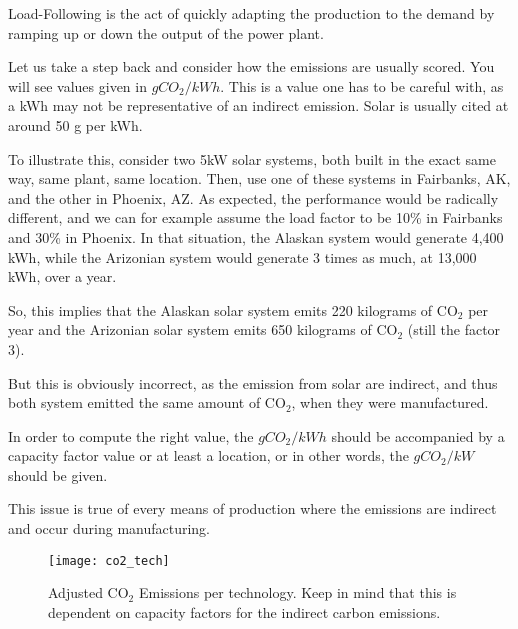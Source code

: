 \begin{kaobox}[frametitle=Load Follow]
Load-Following is the act of quickly adapting the production to the demand by ramping up or down the output of the power plant.
\end{kaobox}

\begin{kaobox}[frametitle=A look at some values]

Let us take a step back and consider how the emissions are usually scored. You will see values given in $gCO_2/kWh$. This is a value one has to be careful with, as a kWh may not be representative of an indirect emission. Solar is usually cited at around 50 g per kWh.

To illustrate this, consider two 5kW solar systems, both built in the exact same way, same plant, same location. Then, use one of these systems in Fairbanks, AK, and the other in Phoenix, AZ. As expected, the performance would be radically different, and we can for example assume the load factor to be 10\% in Fairbanks and 30\% in Phoenix. In that situation, the Alaskan system would generate 4,400 kWh, while the Arizonian system would generate 3 times as much, at 13,000 kWh, over a year.

So, this implies that the Alaskan solar system emits 220 kilograms of $\mathrm{CO_2}$
per year and the Arizonian solar system emits 650 kilograms of $\mathrm{CO_2}$ (still the factor 3).

But this is obviously incorrect, as the emission from solar are indirect, and thus both system emitted the same amount of $\mathrm{CO_2}$, when they were manufactured.

In order to compute the right value, the $gCO_2/kWh$ should be accompanied by a capacity factor value or at least a location, or in other words, the $gCO_2/kW$ should be given.

This issue is true of every means of production where the emissions are indirect and occur during manufacturing.

\end{kaobox}

\begin{figure}[h]
	\texttt{[image: co2\_tech]}
	\caption[Adjusted $\mathrm{CO_2}$ Emissions per technology. Keep in mind that this is dependent on capacity factors for the indirect carbon emissions.]{Adjusted $\mathrm{CO_2}$ Emissions per technology. Keep in mind that this is dependent on capacity factors for the indirect carbon emissions.}
\end{figure}



